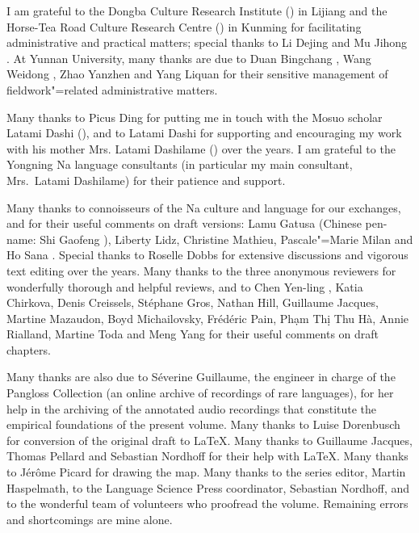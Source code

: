 I am grateful to the Dongba Culture Research Institute () in Lijiang and the Horse-Tea Road Culture Research Centre () in Kunming for facilitating administrative and practical matters; special thanks to Li Dejing  and Mu Jihong . At Yunnan University, many thanks are due to Duan Bingchang , Wang Weidong , Zhao Yanzhen  and Yang Liquan  for their sensitive management of fieldwork"=related administrative matters. 


Many thanks to Picus Ding for putting me in touch with the Mosuo scholar Latami Dashi  (), and to Latami Dashi for supporting and encouraging my work with his mother Mrs. Latami Dashilame  () over the years. I am grateful to the Yongning Na language consultants (in particular my main consultant, Mrs.~Latami Dashilame) for their patience and support. 

Many thanks to connoisseurs of the Na culture and language for our exchanges, and for their useful comments on draft versions: Lamu Gatusa  (Chinese pen-name: Shi Gaofeng ), Liberty Lidz, Christine Mathieu, Pascale"=Marie Milan and Ho Sana . Special thanks to Roselle Dobbs for extensive discussions and vigorous text editing over the years. Many thanks to the three anonymous reviewers for wonderfully thorough and helpful reviews, and to Chen Yen-ling , Katia Chirkova, Denis Creissels, Stéphane Gros, Nathan Hill, Guillaume Jacques, Martine Mazaudon, Boyd Michailovsky, Frédéric Pain, Phạm Thị Thu Hà, Annie Rialland, Martine Toda and Meng Yang for their useful comments on draft chapters. 

Many thanks are also due to Séverine Guillaume, the engineer in charge of the Pangloss Collection (an online archive of recordings of rare languages), for her help in the archiving of the annotated audio recordings that constitute the empirical foundations of the present volume. Many thanks to Luise Dorenbusch for conversion of the original draft to \LaTeX{}.
 Many thanks to Guillaume Jacques, Thomas Pellard and Sebastian Nordhoff for their help with \LaTeX{}. Many thanks to Jérôme Picard for drawing the map. Many thanks to the series editor, Martin Haspelmath, to the Language Science Press coordinator, Sebastian Nordhoff, and to the wonderful team of volunteers who proofread the volume. Remaining errors and shortcomings are mine alone.

